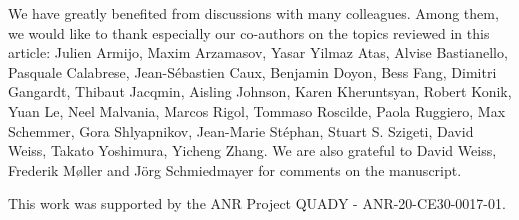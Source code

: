 \documentclass[onecolumn,amsfonts,showpacs,superscriptaddress]{revtex4-1}
\begin{document}
 
\begin{acknowledgments}
We have greatly benefited from discussions  with many colleagues. Among them, we would like to thank especially our co-authors on the topics reviewed in this article: 
Julien Armijo, Maxim Arzamasov, Yasar Yilmaz Atas, Alvise Bastianello, Pasquale Calabrese, Jean-S\'ebastien Caux, Benjamin Doyon, Bess Fang, Dimitri Gangardt, Thibaut Jacqmin, Aisling Johnson, Karen Kheruntsyan, Robert Konik, Yuan Le, Neel Malvania, Marcos Rigol, Tommaso Roscilde, Paola Ruggiero, Max Schemmer, Gora Shlyapnikov, Jean-Marie St\'ephan, Stuart S. Szigeti, David Weiss, Takato Yoshimura, Yicheng Zhang. 
We are also grateful to David Weiss, Frederik M\o ller and J\"org Schmiedmayer for comments on the manuscript.



This  work  was  supported by the ANR Project QUADY - ANR-20-CE30-0017-01.

\end{acknowledgments}
\end{document}
